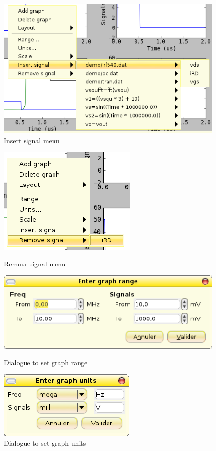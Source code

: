 \documentclass[a4paper,11pt]{article}
\begin{document}
\begin{figure}[htbp]
  \begin{minipage}{0.45\linewidth}
    \includegraphics[scale=.5]{../png/ioscopy-insert.png}
    \caption{Insert signal menu}
    \label{fig:insert}
  \end{minipage}

\end{figure}

\begin{figure}[htbp]
  \centering
  \includegraphics[scale=.5]{../png/ioscopy-remove.png}
  \caption{Remove signal menu}
  \label{fig:remove}

  \includegraphics[scale=.5]{../png/ioscopy-range.png}
  \caption{Dialogue to set graph range}
  \label{fig:range}

  \includegraphics[scale=.5]{../png/ioscopy-units.png}
  \caption{Dialogue to set graph units}
  \label{fig:units}

\end{figure}
\end{document}
